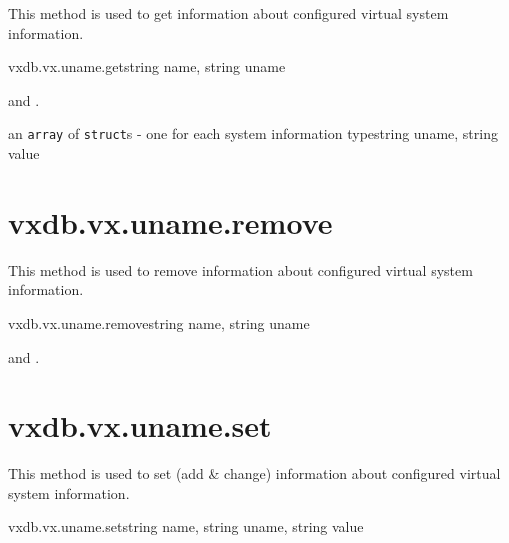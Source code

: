 This method is used to get information about configured virtual system
information.

\begin{rpcsynopsis}{vxdb.vx.uname.get}{string name, string uname}
\end{rpcsynopsis}

\begin{rpcaccess}
 and \rpcownerchecks.
\end{rpcaccess}

\begin{rpcreturncomplex}{an \texttt{array} of \texttt{struct}s - one for each
	system information type}{string uname, string value}
\end{rpcreturncomplex}

\rpcnoerrors


\section{vxdb.vx.uname.remove}

This method is used to remove information about configured virtual system
information.

\begin{rpcsynopsis}{vxdb.vx.uname.remove}{string name, string uname}
\end{rpcsynopsis}

\begin{rpcaccess}
 and \rpcownerchecks.
\end{rpcaccess}

\rpcreturnnil

\rpcnoerrors


\section{vxdb.vx.uname.set}

This method is used to set (add \& change) information about configured virtual
system information.

\begin{rpcsynopsis}{vxdb.vx.uname.set}{string name, string uname, string value}
\end{rpcsynopsis}

